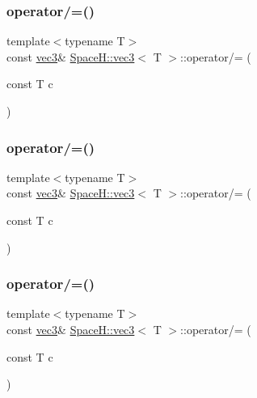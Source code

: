 \subsubsection{\texorpdfstring{operator/=()}{operator/=()}\hspace{0.1cm}{\footnotesize\ttfamily [5/7]}}
{\footnotesize\ttfamily template$<$typename T$>$ \\
const \mbox{\hyperlink{struct_space_h_1_1vec3}{vec3}}\& \mbox{\hyperlink{struct_space_h_1_1vec3}{Space\+H\+::vec3}}$<$ T $>$\+::operator/= (\begin{DoxyParamCaption}\item[{const T}]{c }\end{DoxyParamCaption})\hspace{0.3cm}{\ttfamily [inline]}}

\mbox{\label{struct_space_h_1_1vec3_afd7ec569421aa04734cebdb346b9bdbf}} 
\subsubsection{\texorpdfstring{operator/=()}{operator/=()}\hspace{0.1cm}{\footnotesize\ttfamily [6/7]}}
{\footnotesize\ttfamily template$<$typename T$>$ \\
const \mbox{\hyperlink{struct_space_h_1_1vec3}{vec3}}\& \mbox{\hyperlink{struct_space_h_1_1vec3}{Space\+H\+::vec3}}$<$ T $>$\+::operator/= (\begin{DoxyParamCaption}\item[{const T}]{c }\end{DoxyParamCaption})\hspace{0.3cm}{\ttfamily [inline]}}

\mbox{\label{struct_space_h_1_1vec3_afd7ec569421aa04734cebdb346b9bdbf}} 
\subsubsection{\texorpdfstring{operator/=()}{operator/=()}\hspace{0.1cm}{\footnotesize\ttfamily [7/7]}}
{\footnotesize\ttfamily template$<$typename T$>$ \\
const \mbox{\hyperlink{struct_space_h_1_1vec3}{vec3}}\& \mbox{\hyperlink{struct_space_h_1_1vec3}{Space\+H\+::vec3}}$<$ T $>$\+::operator/= (\begin{DoxyParamCaption}\item[{const T}]{c }\end{DoxyParamCaption})\hspace{0.3cm}{\ttfamily [inline]}}

